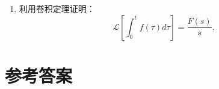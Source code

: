 \begin{enumerate}
  \begin{enumerate}
  \def\labelenumii{(\arabic{enumii})}
  \tightlist
  \item
    \(y''+4y=0,\ y(0)=0,\ y'(0)=2\)；
  \item
    \(y''-y=t,\ y(0)=0,\ y'(0)=1\)；
  \item
    微分方程组 \(\begin{cases}x'+2y=0\\y'-x=0\end{cases}\)，初始条件
    \(x(0)=1,\ y(0)=0\)。
  \end{enumerate}
\item
  利用卷积定理证明： \[
  \mathcal L\left[\int_0^t f(\tau)d\tau\right]=\dfrac{F(s)}{s}.
  \]
\end{enumerate}

\section{参考答案}\label{ux53c2ux8003ux7b54ux6848-7}

